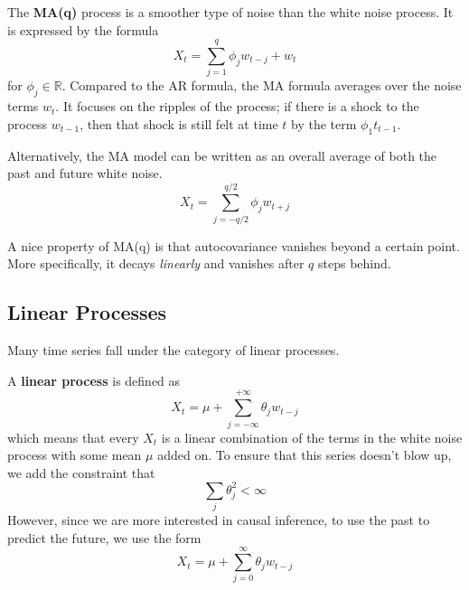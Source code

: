 \documentclass{article}
\begin{document}
    \begin{definition}
      The \textbf{MA(q)} process is a smoother type of noise than the white noise process. It is expressed by the formula 
      \begin{equation}
        X_t = \sum_{j=1}^q \phi_j w_{t-j} + w_t
      \end{equation}
      for $\phi_j \in \mathbb{R}$. Compared to the AR formula, the MA formula averages over the noise terms $w_t$. It focuses on the ripples of the process; if there is a shock to the process $w_{t-1}$, then that shock is still felt at time $t$ by the term $\phi_1 t_{t-1}$. 

      Alternatively, the MA model can be written as an overall average of both the past and future white noise. 
      \begin{equation}
        X_t = \sum_{j=-q/2}^{q/2} \phi_j w_{t +j}
      \end{equation}
    \end{definition}

    \begin{theorem}
      A nice property of MA(q) is that autocovariance vanishes beyond a certain point. More specifically, it decays \textit{linearly} and vanishes after $q$ steps behind. 
    \end{theorem}

  \subsection{Linear Processes}

    Many time series fall under the category of linear processes. 

    \begin{definition}
      A \textbf{linear process} is defined as 
      \begin{equation}
        X_t = \mu + \sum_{j=-\infty}^{+\infty} \theta_j w_{t-j}
      \end{equation}
      which means that every $X_t$ is a linear combination of the terms in the white noise process with some mean $\mu$ added on. To ensure that this series doesn't blow up, we add the constraint that 
      \begin{equation}
        \sum_{j} \theta_j^2 < \infty
      \end{equation}
      However, since we are more interested in causal inference, to use the past to predict the future, we use the form 
      \begin{equation}
        X_t = \mu + \sum_{j=0}^{\infty} \theta_j w_{t-j}
      \end{equation}
    \end{definition}
\end{document}
